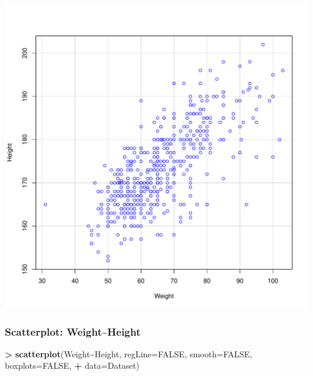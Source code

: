 \documentclass[
]{article}
\newenvironment{Shaded}{\begin{snugshade}}{\end{snugshade}}
\newcommand{\AttributeTok}[1]{\textcolor[rgb]{0.13,0.29,0.53}{#1}}
\newcommand{\ConstantTok}[1]{\textcolor[rgb]{0.56,0.35,0.01}{#1}}
\newcommand{\FunctionTok}[1]{\textcolor[rgb]{0.13,0.29,0.53}{\textbf{#1}}}
\newcommand{\NormalTok}[1]{#1}
\newcommand{\SpecialCharTok}[1]{\textcolor[rgb]{0.81,0.36,0.00}{\textbf{#1}}}
\begin{document}
\includegraphics[width=750px]{RcmdrMarkdown_files/figure-latex/unnamed-chunk-24-1}

\subsubsection{Scatterplot:
Weight\textasciitilde Height}\label{scatterplot-weightheight}

\begin{Shaded}
\begin{Highlighting}[]
\SpecialCharTok{\textgreater{}} \FunctionTok{scatterplot}\NormalTok{(Weight}\SpecialCharTok{\textasciitilde{}}\NormalTok{Height, }\AttributeTok{regLine=}\ConstantTok{FALSE}\NormalTok{, }\AttributeTok{smooth=}\ConstantTok{FALSE}\NormalTok{, }\AttributeTok{boxplots=}\ConstantTok{FALSE}\NormalTok{, }
\SpecialCharTok{+}   \AttributeTok{data=}\NormalTok{Dataset)}
\end{Highlighting}
\end{Shaded}
\end{document}
